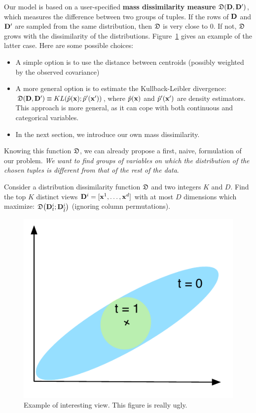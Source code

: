 Our model is based on a user-specified \textbf{mass dissimilarity measure}
$\mathfrak{D}(\mathbf{D}, \mathbf{D}')$, which measures the difference between two groups of
tuples. If the rows of $\mathbf{D}$ and $\mathbf{D}'$ are sampled from the same
distribution, then $\mathfrak{D}$ is very close to 0. If
not, $\mathfrak{D}$ grows with the dissimilarity of the distributions.
Figure~\ref{pic:sameMean} gives an example of the latter case.  Here are some
possible choices:
\begin{itemize}
    \item A simple option is to use the distance between centroids (possibly
        weighted by the observed covariance)
    \item A more general option is to estimate the Kullback-Leibler divergence:
        $\mathfrak{D}(\mathbf{D}, \mathbf{D}') \equiv KL(\hat{p}(\mathbf{x});
        \hat{p}'(\mathbf{x}'))$, where $\hat{p}(\mathbf{x})$ and $\hat{p}'(\mathbf{x}')$
        are density estimators. This approach is more general, as it can cope
        with both continuous and categorical variables.
    \item In the next section, we introduce our own mass dissimilarity.
\end{itemize}
Knowing this function $\mathfrak{D}$, we can already propose a first, naive,
formulation of our problem. \emph{We want to find groups of variables on which the
distribution of the chosen tuples is different from that of the rest of the
data}.
\begin{problem}
    Consider a distribution dissimilarity function $\mathfrak{D}$ and two integers
    $K$ and $D$. Find the top $K$ distinct views $\mathbf{D}^i = [\mathbf{x}^1, \dots,
    \mathbf{x}^d]$ with at most $D$ dimensions which maximize: $ \mathfrak{D}\big(
    \mathbf{D}^i_t ; \mathbf{D}^i_{\overline{t}} \big)$ (ignoring column permutations).
\end{problem}
\begin{figure}
  \centering
  \includegraphics[width=0.5\columnwidth]{Figures/SameMean}
  \caption{Example of interesting view. {\color{red}This figure is really ugly.}}
  \label{pic:sameMean}
\end{figure}

